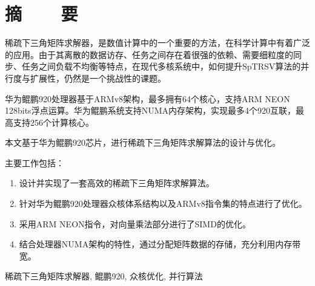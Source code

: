 \renewcommand{\baselinestretch}{1.5}
\fontsize{12pt}{13pt}\selectfont

\chapter[摘要]{摘~~~~要}

稀疏下三角矩阵求解器，是数值计算中的一个重要的方法，在科学计算中有着广泛的应用。由于其离散的数据访存、任务之间存在着很强的依赖、需要细粒度的同步、任务之间负载不均衡等特点，在现代多核系统中，如何提升SpTRSV算法的并行度与扩展性，仍然是一个挑战性的课题。

华为鲲鹏920处理器基于ARMv8架构，最多拥有64个核心，支持ARM NEON 128bits浮点运算。华为鲲鹏系统支持NUMA内存架构，实现最多4个920互联，最高支持256个计算核心。

本文基于华为鲲鹏920芯片，进行稀疏下三角矩阵求解算法的设计与优化。

主要工作包括：
\vspace{-10pt}
\begin{enumerate}
    \item 设计并实现了一套高效的稀疏下三角矩阵求解算法。
    \item 针对华为鲲鹏920处理器众核体系结构以及ARMv8指令集的特点进行了优化。
    \item 采用ARM NEON指令，对向量乘法部分进行了SIMD的优化。
    \item 结合处理器NUMA架构的特性，通过分配矩阵数据的存储，充分利用内存带宽。
\end{enumerate}
\vspace{-10pt}

\vspace{1em}
 \quad 稀疏下三角矩阵求解器, 鲲鹏920, 众核优化, 并行算法

\clearpage
\endinput
